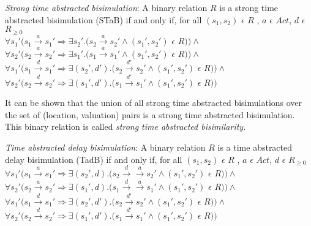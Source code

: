 \begin{definition} 
\label{def:stab} 
  \emph{Strong time abstracted bisimulation}: A binary relation
  $R$ is a strong time abstracted bisimulation (STaB) if and only if, for all
  $(s_1, s_2)$ $\epsilon$ $R$ , $a$ $\epsilon$ $Act $, $d$ $\epsilon$ $R_{\ge 0}$\\
  $\forall s_1' (s_1 \xrightarrow{a} s_1' \Rightarrow \exists s_2'
  . (s_2 \xrightarrow{a} s_2' \wedge (s_1', s_2')$ $\epsilon$ $R ) )
  \wedge $ \\
  $\forall s_2' (s_2 \xrightarrow{a} s_2' \Rightarrow \exists s_1'
  . (s_1 \xrightarrow{a} s_1' \wedge (s_1', s_2')$ $\epsilon$ $R ) ) \wedge $ \\
  $\forall s_1' (s_1 \xrightarrow{d} s_1' \Rightarrow \exists (s_2',
  d')
  . (s_2 \xrightarrow{d'} s_2' \wedge (s_1', s_2')$ $\epsilon$ $R ) )
  \wedge $ \\
  $\forall s_2' (s_2 \xrightarrow{d} s_2' \Rightarrow \exists (s_1', d')
  . (s_1 \xrightarrow{d'} s_1' \wedge (s_1', s_2')$ $\epsilon$ $R ) ) $ \\
\end{definition}

It can be shown that the union of all strong time abstracted
  bisimulations over the set of (location, valuation) pairs is a
  strong time abstracted bisimulation. This binary relation is called
  \textit{strong time abstracted bisimilarity}.

\begin{definition}
  \emph{Time abstracted delay bisimulation}: A binary relation
  $R$ is a time abstracted delay bisimulation (TadB) if and only if, for all
  $(s_1, s_2)$ $\epsilon$ $R$ , $a$ $\epsilon$ $Act $, $d$ $\epsilon$ $R_{\ge 0}$\\
  $\forall s_1' (s_1 \xrightarrow{a} s_1' \Rightarrow \exists (s_2', d)
  . (s_2 \xrightarrow{d} \xrightarrow{a} s_2' \wedge (s_1', s_2')$ $\epsilon$ $R ) )
  \wedge $ \\
  $\forall s_2' (s_2 \xrightarrow{a} s_2' \Rightarrow \exists (s_1', d)
  . (s_1 \xrightarrow{d} \xrightarrow{a} s_1' \wedge (s_1', s_2')$
  $\epsilon$ $R ) ) 
  \wedge $ \\
  $\forall s_1' (s_1 \xrightarrow{d} s_1' \Rightarrow \exists (s_2',
  d')
  . (s_2 \xrightarrow{d'} s_2' \wedge (s_1', s_2')$ $\epsilon$ $R ) )
  \wedge $ \\
  $\forall s_2' (s_2 \xrightarrow{d} s_2' \Rightarrow \exists (s_1', d')
  . (s_1 \xrightarrow{d'} s_1' \wedge (s_1', s_2')$ $\epsilon$ $R ) ) $ \\
\end{definition}


